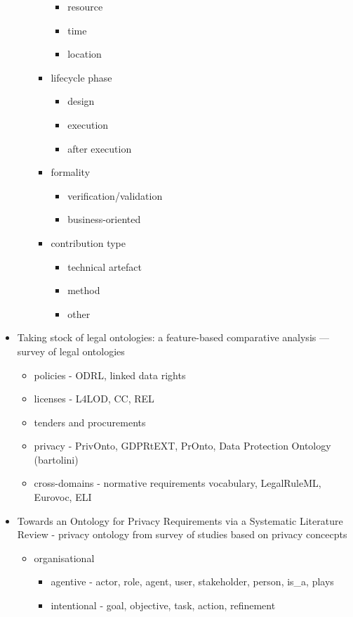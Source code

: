 \begin{itemize}
\begin{itemize}
\begin{itemize}
\begin{itemize}
			\item resource
			\item time
			\item location
			\end{itemize}
		\item lifecycle phase
			\begin{itemize}
			\item design
			\item execution
			\item after execution
			\end{itemize}
		\item formality
			\begin{itemize}
			\item verification/validation
			\item business-oriented
			\end{itemize}
		\item contribution type
			\begin{itemize}
			\item technical artefact
			\item method
			\item other
			\end{itemize}
		\end{itemize}
	\end{itemize}
\item Taking stock of legal ontologies: a feature-based comparative analysis — survey of legal ontologies
	\begin{itemize}
	\item policies - ODRL, linked data rights
	\item licenses - L4LOD, CC, REL
	\item tenders and procurements
	\item privacy - PrivOnto, GDPRtEXT, PrOnto, Data Protection Ontology (bartolini)
	\item cross-domains - normative requirements vocabulary, LegalRuleML, Eurovoc, ELI
	\end{itemize}
\item Towards an Ontology for Privacy Requirements via a Systematic Literature Review - privacy ontology from survey of studies based on privacy concecpts
	\begin{itemize}
	\item organisational
		\begin{itemize}
		\item agentive - actor, role, agent, user, stakeholder, person, is\_a, plays
		\item intentional - goal, objective, task, action, refinement

\end{itemize}
\end{itemize}
\end{itemize}
